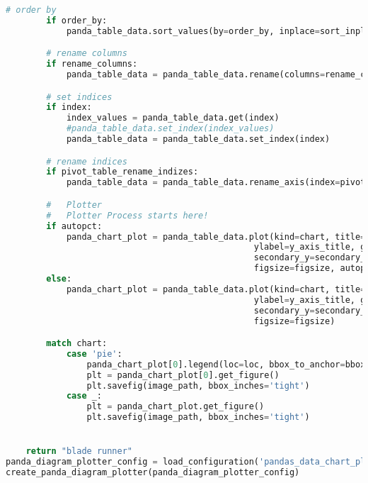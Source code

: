 \begin{lstlisting}[language=python, caption=Python LaTex - pandas\_data\_chart\_plotter.py CSV - Diagramm,captionpos=b,label={lst:pandas_data_chart_plotter},breaklines=true]
        # order by
        if order_by:
            panda_table_data.sort_values(by=order_by, inplace=sort_inplace, ascending=sort_acending)

        # rename columns
        if rename_columns:
            panda_table_data = panda_table_data.rename(columns=rename_columns)

        # set indices
        if index:
            index_values = panda_table_data.get(index)
            #panda_table_data.set_index(index_values)
            panda_table_data = panda_table_data.set_index(index)

        # rename indices
        if pivot_table_rename_indizes:
            panda_table_data = panda_table_data.rename_axis(index=pivot_table_rename_indizes)

        #   Plotter
        #   Plotter Process starts here!
        if autopct:
            panda_chart_plot = panda_table_data.plot(kind=chart, title=title, y=y_axis_columns, x=x_axis_columns, xlabel=x_axis_title,
                                                 ylabel=y_axis_title, grid=grid, stacked=stacked, legend=legend,
                                                 secondary_y=secondary_y, subplots=subplots, rot=rot, fontsize=fontsize,
                                                 figsize=figsize, autopct=autopct)
        else:
            panda_chart_plot = panda_table_data.plot(kind=chart, title=title, y=y_axis_columns, x=x_axis_columns, xlabel=x_axis_title,
                                                 ylabel=y_axis_title, grid=grid, stacked=stacked, legend=legend,
                                                 secondary_y=secondary_y, subplots=subplots, rot=rot, fontsize=fontsize,
                                                 figsize=figsize)

        match chart:
            case 'pie':
                panda_chart_plot[0].legend(loc=loc, bbox_to_anchor=bbox_to_anchor)
                plt = panda_chart_plot[0].get_figure()
                plt.savefig(image_path, bbox_inches='tight')
            case _:
                plt = panda_chart_plot.get_figure()
                plt.savefig(image_path, bbox_inches='tight')


    return "blade runner"
panda_diagram_plotter_config = load_configuration('pandas_data_chart_plotter_conf.yaml')
create_panda_diagram_plotter(panda_diagram_plotter_config)
\end{lstlisting}